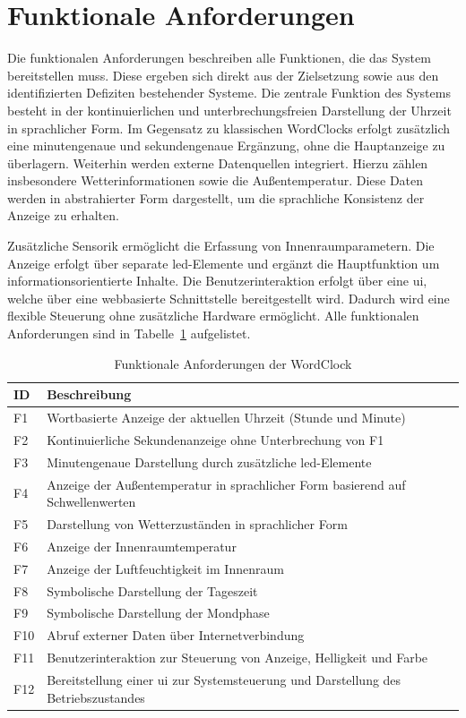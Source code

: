 \section{Funktionale Anforderungen}
Die funktionalen Anforderungen beschreiben alle Funktionen, die das System bereitstellen muss.
Diese ergeben sich direkt aus der Zielsetzung sowie aus den identifizierten Defiziten bestehender Systeme.
Die zentrale Funktion des Systems besteht in der kontinuierlichen und unterbrechungsfreien Darstellung der Uhrzeit in sprachlicher Form.
Im Gegensatz zu klassischen WordClocks erfolgt zusätzlich eine minutengenaue und sekundengenaue Ergänzung, ohne die Hauptanzeige zu überlagern.
Weiterhin werden externe Datenquellen integriert.
Hierzu zählen insbesondere Wetterinformationen sowie die Außentemperatur.
Diese Daten werden in abstrahierter Form dargestellt, um die sprachliche Konsistenz der Anzeige zu erhalten.

Zusätzliche Sensorik ermöglicht die Erfassung von Innenraumparametern.
Die Anzeige erfolgt über separate \gls{led}-Elemente und ergänzt die Hauptfunktion um informationsorientierte Inhalte.
Die Benutzerinteraktion erfolgt über eine \gls{ui}, welche über eine webbasierte Schnittstelle bereitgestellt wird.
Dadurch wird eine flexible Steuerung ohne zusätzliche Hardware ermöglicht.
Alle funktionalen Anforderungen sind in Tabelle~\ref{tab:Funktionale Anforderung} aufgelistet.

\begin{table}[H]
\caption{Funktionale Anforderungen der WordClock}
\centering
\begin{tabular}{p{0.5cm} p{15cm}}
\textbf{ID} & \textbf{Beschreibung} \\
\hline
F1 & Wortbasierte Anzeige der aktuellen Uhrzeit (Stunde und Minute) \\
F2 & Kontinuierliche Sekundenanzeige ohne Unterbrechung von F1 \\
F3 & Minutengenaue Darstellung durch zusätzliche \gls{led}-Elemente \\
F4 & Anzeige der Außentemperatur in sprachlicher Form basierend auf Schwellenwerten \\
F5 & Darstellung von Wetterzuständen in sprachlicher Form \\
F6 & Anzeige der Innenraumtemperatur \\
F7 & Anzeige der Luftfeuchtigkeit im Innenraum \\
F8 & Symbolische Darstellung der Tageszeit \\
F9 & Symbolische Darstellung der Mondphase \\
F10 & Abruf externer Daten über Internetverbindung \\
F11 & Benutzerinteraktion zur Steuerung von Anzeige, Helligkeit und Farbe \\
F12 & Bereitstellung einer \gls{ui} zur Systemsteuerung und Darstellung des Betriebszustandes \\
\end{tabular}
\label{tab:Funktionale Anforderung}
\end{table}
